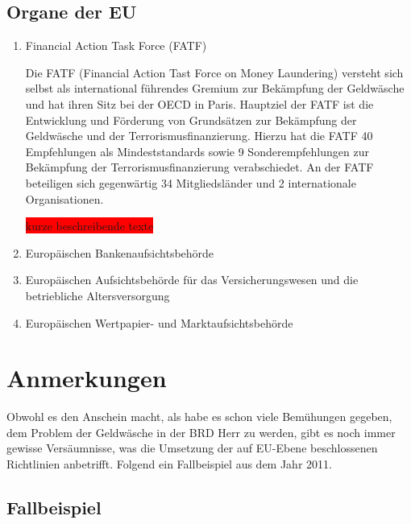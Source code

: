 \documentclass{article}
\begin{document}
        \subsection[Organe EU]{Organe der EU}

            \begin{enumerate}

                \item Financial Action Task Force (FATF)

                    Die FATF (Financial Action Tast Force on Money Laundering) versteht sich selbst als international führendes Gremium zur Bekämpfung der Geldwäsche und hat ihren Sitz bei der OECD in Paris. Hauptziel der FATF ist die Entwicklung und Förderung von Grundsätzen zur Bekämpfung der Geldwäsche und der Terrorismusfinanzierung. Hierzu hat die FATF 40 Empfehlungen als Mindeststandards sowie 9 Sonderempfehlungen zur Bekämpfung der Terrorismusfinanzierung verabschiedet. An der FATF beteiligen sich gegenwärtig 34 Mitgliedsländer und 2 internationale Organisationen.

                    \colorbox{red}{kurze beschreibende texte}

                \item Europäischen Bankenaufsichtsbehörde 

                \item Europäischen Aufsichtsbehörde für das Versicherungswesen und die betriebliche Altersversorgung 

                \item Europäischen Wertpapier- und Marktaufsichtsbehörde 

            \end{enumerate}        

\newpage

    \section[Anmerkungen]{Anmerkungen}

        Obwohl es den Anschein macht, als habe es schon viele Bemühungen gegeben, dem Problem der Geldwäsche in der BRD Herr zu werden, gibt es noch immer gewisse Versäumnisse, was die Umsetzung der auf EU-Ebene beschlossenen Richtlinien anbetrifft. Folgend ein Fallbeispiel aus dem Jahr 2011.

        \subsection[Fallbeispiel]{Fallbeispiel}
\end{document}
